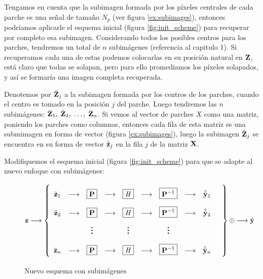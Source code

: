 Tengamos en cuenta que la subimagen formada por los p\'ixeles centrales de cada parche es una señal de tamaño $N_p$ (ver figura \ref{ex:subimages}), entonces podr\'iamos aplicarle el esquema inicial (figura \ref{fig:init_scheme}) para recuperar por completo esa subimagen. Considerando todos los posibles centros para los parches, tendremos un total de $n$ subim\'agenes (referencia al capitulo 1). Si recuperamos cada una de estas podemos colocarlas en su posición natural en $\mathbf{Z}$, est\'a claro que todas se solapan, pero para ello promediamos los p\'ixeles solapados, y así se formar\'ia una imagen completa recuperada. 

Denotemos por $\tilde{\mathbf{Z}}_j$ a la subimagen formada por los centros de los parches, cuando el centro es tomado en la posici\'on $j$ del parche. Luego tendremos las $n$ subim\'agenes: $\tilde{\mathbf{Z}}_1,\; \tilde{\mathbf{Z}}_2,\; \dots,\; \tilde{\mathbf{Z}}_n$. Si vemos al vector de parches $X$ como una matriz, poniendo los parches como columnas, entonces cada fila de esta matriz es una submimagen en forma de vector (figura \ref{ex:subimages}), luego la subimagen $\tilde{\mathbf{Z}}_j$ se encuentra en su forma de vector $\tilde{\mathbf{z}}_j$ en la fila $j$ de la matriz $\mathbf{X}$.

Modifiquemos el esquema inicial (figura \ref{fig:init_scheme}) para que se adapte al nuevo enfoque con subim\'agenes:

\begin{figure}[h]
	\begin{equation*}
		\z\longrightarrow\left\{
		\def\arraystretch{2.2}
		\begin{array}{ccccccccccc}
			\ztilde_1 & \longrightarrow & \boxed{\P} & \longrightarrow & \boxed{\H} & \longrightarrow & \boxed{\P^{-1}} & \longrightarrow & \yhattilde_1\\
			\ztilde_2 & \longrightarrow & \boxed{\P} & \longrightarrow & \boxed{\H} & \longrightarrow & \boxed{\P^{-1}} & \longrightarrow & \yhattilde_2\\
			& & \huge\vdots &  & \huge\vdots &  & \huge\vdots & & & \\
			\ztilde_n & \longrightarrow & \boxed{\P} & \longrightarrow & \boxed{\H} & \longrightarrow & \boxed{\P^{-1}} & \longrightarrow & \yhattilde_n\\
		\end{array}
		\right\}\oplus\longrightarrow\yhat
	\end{equation*}
	\caption{Nuevo esquema con subim\'agenes}
	\label{fig:subimage_scheme}
\end{figure}

